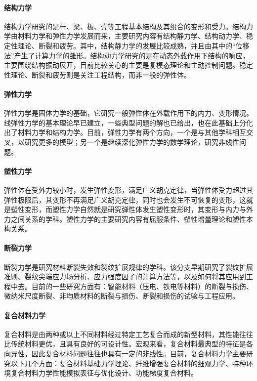 \paragraph{结构力学}

结构力学研究的是杆、梁、板、壳等工程基本结构及其组合的变形和受力。结构力学由材料力学和弹性力学发展而来，主要研究内容有结构静力学、结构动力学、稳定性理论、断裂和疲劳。其中，结构静力学的发展比较成熟，并且由其中的“位移法”产生了计算力学的雏形。结构动力学研究的是在动态外载作用下结构的响应，主要围绕结构振动展开，目前比较关心的主要是复模态理论和主动控制问题。稳定性理论、断裂和疲劳则是关注工程结构，而非一般的弹性体。

\paragraph{弹性力学}

弹性力学是固体力学的基础，它研究一般弹性体在外载作用下的内力、变形情况。线弹性力学的基本理论早已建立，一些典型问题的解也已给出，也在此基础上分化出了材料力学和结构力学。目前，弹性力学有两个方向，一个是与其他学科相互交叉，以研究更多的模型；另一个是继续深化弹性力学的数学理论，研究非线性问题。

\paragraph{塑性力学}

弹性体在受外力较小时，发生弹性变形，满足广义胡克定律，当弹性体受力超过其弹性极限后，其变形不再满足广义胡克定律，同时也会发生不可恢复的变形，这就是塑性变形，而塑性力学自然就是研究弹性体发生塑性变形时，其变形与内力与外力之间关系的学科。塑性力学的主要研究内容有屈服条件、塑性增量理论和塑性本构关系。

\paragraph{断裂力学}

断裂力学是研究材料断裂失效和裂纹扩展规律的学科。该分支早期研究了裂纹扩展准则、裂纹尖端应力场分析、应力强度因子的计算方法等，以及如何将其应用到工程中去。目前的一些研究方面有：智能材料（压电、铁电等材料）的断裂与损伤、微纳米尺度断裂、非均质材料的断裂与损伤、断裂和损伤的试验与工程应用。

\paragraph{复合材料力学}

复合材料是由两种或以上不同材料经过特定工艺复合而成的新型材料，其性能往往比传统材料更优，且具有良好的可设计性。宏观来看，复合材料最典型的特征是各向异性，因此复合材料问题往往也具有一定的非线性。目前，复合材料力学主要研究以下几个方面：复合材料基础力学理论、纤维增强复合材料的细观力学、特种环境复合材料力学性能模拟表征与优化设计、功能梯度复合材料。

